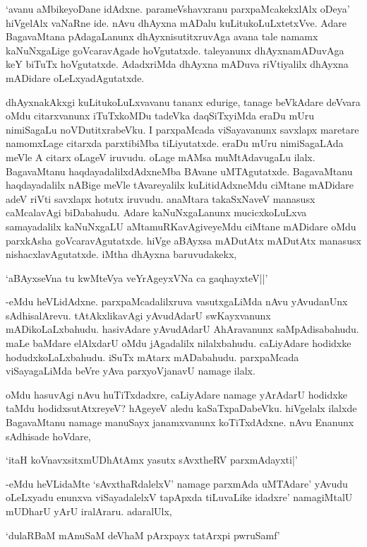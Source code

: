 `avanu aMbikeyoDane idAdxne. parameVshavxranu parxpaMcakekxlAlx oDeya' hiVgelAlx vaNaRne ide. nAvu dhAyxna mADalu kuLitukoLuLxtetxVve. Adare BagavaMtana pAdagaLanunx dhAyxnisutitxruvAga avana tale namamx kaNuNxgaLige goVcaravAgade hoVgutatxde. taleyanunx dhAyxnamADuvAga keY biTuTx hoVgutatxde. AdadxriMda dhAyxna mADuva riVtiyalilx dhAyxna mADidare oLeLxyadAgutatxde.

dhAyxnakAkxgi kuLitukoLuLxvavanu tananx edurige, tanage beVkAdare deVvara oMdu citarxvanunx iTuTxkoMDu tadeVka daqSiTxyiMda eraDu mUru nimiSagaLu noVDutitxrabeVku. I parxpaMcada viSayavanunx savxlapx maretare namomxLage citarxda parxtibiMba tiLiyutatxde. eraDu mUru nimiSagaLAda meVle A citarx oLageV iruvudu. oLage mAMsa muMtAdavugaLu ilalx. BagavaMtanu haqdayadalilxdAdxneMba BAvane uMTAgutatxde. BagavaMtanu haqdayadalilx nABige meVle tAvareyalilx kuLitidAdxneMdu ciMtane mADidare adeV riVti savxlapx hotutx iruvudu. anaMtara takaSxNaveV manasusx caMcalavAgi biDabahudu. Adare kaNuNxgaLanunx mucicxkoLuLxva samayadalilx kaNuNxgaLU aMtamuRKavAgiveyeMdu ciMtane mADidare oMdu parxkAsha goVcaravAgutatxde. hiVge aBAyxsa mADutAtx mADutAtx manasusx nishacxlavAgutatxde. iMtha dhAyxna baruvudakekx,

\begin{shloka}
`aBAyxseVna tu kwMteVya veYrAgeyxVNa ca gaqhayxteV||'
\end{shloka} 

-eMdu heVLidAdxne. parxpaMcadalilxruva vasutxgaLiMda nAvu yAvudanUnx sAdhisalArevu. tAtAkxlikavAgi yAvudAdarU swKayxvanunx mADikoLaLxbahudu. hasivAdare yAvudAdarU AhAravanunx saMpAdisabahudu. maLe baMdare elAlxdarU oMdu jAgadalilx nilalxbahudu. caLiyAdare hodidxke hodudxkoLaLxbahudu. iSuTx mAtarx mADabahudu. parxpaMcada viSayagaLiMda beVre yAva parxyoVjanavU namage ilalx.

oMdu hasuvAgi nAvu huTiTxdadxre, caLiyAdare namage yArAdarU hodidxke taMdu hodidxsutAtxreyeV? hAgeyeV aledu kaSaTxpaDabeVku. hiVgelalx ilalxde BagavaMtanu namage manuSayx janamxvanunx koTiTxdAdxne. nAvu Enanunx sAdhisade hoVdare,

\begin{shloka}
`itaH koVnavxsitxmUDhAtAmx yasutx sAvxtheRV parxmAdayxti|'
\end{shloka} 

-eMdu heVLidaMte `sAvxthaRdalelxV' namage parxmAda uMTAdare' yAvudu oLeLxyadu enunxva viSayadalelxV tapApxda tiLuvaLike idadxre' namagiMtalU mUDharU yArU iralAraru. adaralUlx,

\begin{shloka}
`dulaRBaM mAnuSaM deVhaM pArxpayx tatArxpi pwruSamf'
\end{shloka}

